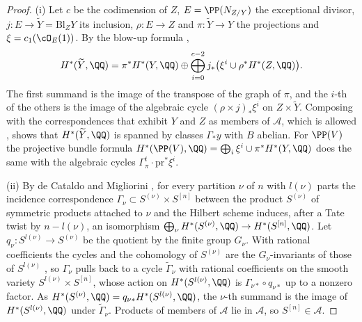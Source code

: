 \begin{proof}
(i) Let $c$ be the codimension of $Z$, $E=\PP(N_{Z/Y})$ the exceptional
divisor, $j\colon E\to\widetilde Y=\mathrm{Bl}_{Z}Y$ its inclusion,
$\rho\colon E\to Z$ and $\pi\colon\widetilde Y\to Y$ the projections and
$\xi=c_{1}(\cO_{E}(1))$. By the blow-up formula \cite[\S7.3.3]{Voi02},
\[
  H^{*}(\widetilde Y,\QQ)=\pi^{*}H^{*}(Y,\QQ)\oplus
  \bigoplus_{i=0}^{c-2}j_{*}\bigl(\xi^{i}\cup\rho^{*}H^{*}(Z,\QQ)\bigr).
\]
The first summand is the image of the transpose of the graph of $\pi$, and
the $i$-th of the others is the image of the algebraic cycle
$(\rho\times j)_{*}\xi^{i}$ on $Z\times\widetilde Y$. Composing with the
correspondences that exhibit $Y$ and $Z$ as members of $\mathcal{A}$, which is
allowed \cite[Chapter~16]{Ful98}, shows that $H^{*}(\widetilde Y,\QQ)$ is
spanned by classes $\Gamma_{*}y$ with $B$ abelian. For $\PP(V)$ the
projective bundle formula $H^{*}(\PP(V),\QQ)=\bigoplus_{i}\xi^{i}\cup
\pi^{*}H^{*}(Y,\QQ)$ \cite[\S7.3.3]{Voi02} does the same with the
algebraic cycles $\Gamma_{\pi}^{t}\cdot\mathrm{pr}^{*}\xi^{i}$.

(ii) By de Cataldo and Migliorini \cite{dCM02}, for every partition $\nu$ of
$n$ with $l(\nu)$ parts the incidence correspondence
$\Gamma_{\nu}\subset S^{(\nu)}\times S^{[n]}$ between the product
$S^{(\nu)}$ of symmetric products attached to $\nu$ and the Hilbert scheme
induces, after a Tate twist by $n-l(\nu)$, an isomorphism
$\bigoplus_{\nu}H^{*}(S^{(\nu)},\QQ)\to H^{*}(S^{[n]},\QQ)$. Let
$q_{\nu}\colon S^{l(\nu)}\to S^{(\nu)}$ be the quotient by the finite group
$G_{\nu}$. With rational coefficients the cycles and the cohomology of
$S^{(\nu)}$ are the $G_{\nu}$-invariants of those of $S^{l(\nu)}$
\cite[Example~1.7.6]{Ful98}, so $\Gamma_{\nu}$ pulls back to a cycle
$\widetilde\Gamma_{\nu}$ with rational coefficients on the smooth variety
$S^{l(\nu)}\times S^{[n]}$, whose action on $H^{*}(S^{l(\nu)},\QQ)$ is
$\Gamma_{\nu*}\circ q_{\nu*}$ up to a nonzero factor. As
$H^{*}(S^{(\nu)},\QQ)=q_{\nu*}H^{*}(S^{l(\nu)},\QQ)$, the $\nu$-th summand
is the image of $H^{*}(S^{l(\nu)},\QQ)$ under $\widetilde\Gamma_{\nu}$. Products of members of $\mathcal{A}$ lie in
$\mathcal{A}$, so $S^{[n]}\in\mathcal{A}$.


\end{proof}
